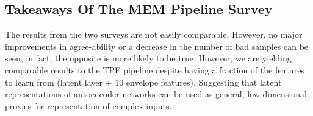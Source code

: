 \documentclass[\main/thesis.tex]{subfiles}
\begin{document}
\subsection{Takeaways Of The MEM Pipeline Survey}
\label{survey2_takeaway}
The results from the two surveys are not easily comparable. However, no major improvements in agree-ability or a decrease in the number of bad samples can be seen, in fact, the opposite is more likely to be true. However, we are yielding comparable results to the TPE pipeline despite having a fraction of the features to learn from (latent layer + 10 envelope features). Suggesting that latent representations of autoencoder networks can be used as general, low-dimensional proxies for representation of complex inputs. 



\end{document}
